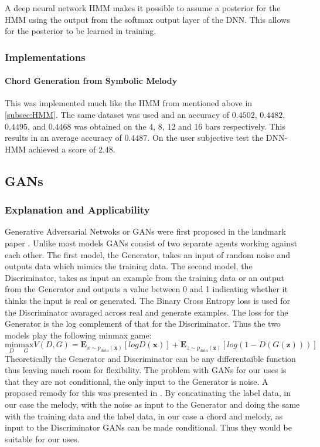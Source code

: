 A deep neural network HMM makes it possible to assume a posterior for the HMM using the output from the softmax output layer of the DNN. 
This allows for the posterior to be learned in training.

\subsubsection{Implementations}

\paragraph{Chord Generation from Symbolic Melody} This was implemented much like the HMM from \cite{BLSTM} mentioned above in \ref{subsec:HMM}.
The same dataset was used and an accuracy of $0.4502$, $0.4482$, $0.4495$, and $0.4468$  was obtained on the 4, 8, 12 and 16 bars respectively. This results in an average accuracy of $0.4487$.
On the user subjective test the DNN-HMM achieved a score of $2.48$.

\subsection{GANs}

\subsubsection{Explanation and Applicability}

Generative Adversarial Netwoks or GANs were first proposed in the landmark paper \cite{GANs}. Unlike most models GANs consist of two separate agents working against each other.
The first model, the Generator, takes an input of random noise and outputs data which mimics the training data. 
The second model, the Discriminator, takes as input an example from the training data or an output from the Generator and outputs a value between 0 and 1 indicating whether it thinks the input is real or generated.
The Binary Cross Entropy loss is used for the Discriminator avaraged across real and generate examples. The loss for the Generator is the log complement of that for the Discriminator. Thus the two models play the following minmax game:
\begin{equation}
\underset{D}{\text{min}} \underset{G}{\text{max}} V(D,G) = \mathbf{E}_{x\sim p_{data}(\mathbf{x})}[logD(\mathbf{x})] + \mathbf{E}_{z\sim p_{data}(\mathbf{z})}[log(1-D(G(\mathbf{z})))]
\end{equation} 
Theoretically the Generator and Discriminator can be any differentaible function thus leaving much room for flexibility.
The problem with GANs for our uses is that they are not conditional, the only input to the Generator is noise. A proposed remody for this was presented in \cite{CGANs}.
By concatinating the label data, in our case the melody, with the noise as input to the Generator and doing the same with the training data and the label data, in our case a chord and melody, as input to the Discriminator GANs can be made conditional. 
Thus they would be suitable for our uses. 

